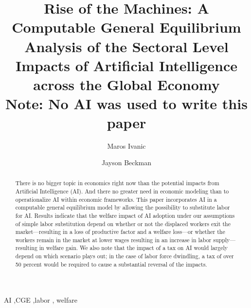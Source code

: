 \documentclass[
  authoryear,
  preprint]{elsarticle}
\begin{document}
\begin{frontmatter}
\title{Rise of the Machines: A Computable General Equilibrium Analysis
of the Sectoral Level Impacts of Artificial Intelligence across the
Global Economy \\\large{Note: No AI was used to write this paper} }
\author[1]{Maros Ivanic%
%
}
\author[2]{Jayson Beckman%
%
}




        
\begin{abstract}
There is no bigger topic in economics right now than the potential
impacts from Artificial Intelligence (AI). And there no greater need in
economic modeling than to operationalize AI within economic frameworks.
This paper incorporates AI in a computable general equilibrium model by
allowing the possibility to substitute labor for AI. Results indicate
that the welfare impact of AI adoption under our assumptions of simple
labor substitution depend on whether or not the displaced workers exit
the market---resulting in a loss of productive factor and a welfare
loss---or whether the workers remain in the market at lower wages
resulting in an increase in labor supply---resulting in welfare gain. We
also note that the impact of a tax on AI would largely depend on which
scenario plays out; in the case of labor force dwindling, a tax of over
50 percent would be required to cause a substantial reversal of the
impacts.
\end{abstract}



\begin{keyword}
    AI \sep CGE \sep labor \sep 
    welfare
\end{keyword}
\end{frontmatter}
    
\end{document}
